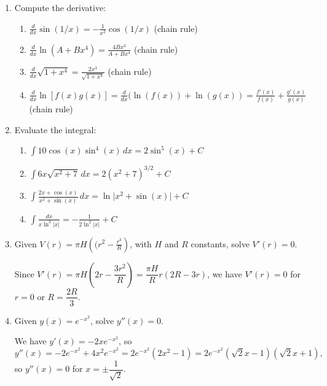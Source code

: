\documentclass[12pt]{article}
\newcommand{\di}{\displaystyle}
\newcommand{\abs}[1]{\lvert #1\rvert}
\begin{document}
  \begin{enumerate}
    \item Compute the derivative:
  
    \begin{enumerate}
    \item $\di\frac{d}{dx}\sin(1/x) = -\frac{1}{x^2}\cos(1/x)$ (chain rule)
    
 
    
    \item $\di\frac{d}{dx}\ln(A+Bx^4) = \frac{4Bx^3}{A+Bx^4}$ (chain rule) 
    
    
    \item $\di\frac{d}{dx}\sqrt{1+x^4} = \frac{2x^3}{\sqrt{1+x^4}}$ (chain rule)
    
    \item $\di\frac{d}{dx}\ln[f(x)g(x)] = \frac{d}{dx}(\ln(f(x))+\ln(g(x))=\frac{f'(x)}{f(x)}+\frac{g'(x)}{g(x)}$ (chain rule)
    
   
    \end{enumerate} 
    \item Evaluate the integral:
    \begin{enumerate}
    \item $\di\int 10\cos(x)\sin^4(x)\,dx = 2\sin^5(x)+C$
    
    
    \item $\di\int 6x\sqrt{x^2+7}\,dx = 2(x^2+7)^{3/2}+C$
    
    
    \item $\di\int\frac{2x+\cos(x)}{x^2+\sin(x)}\,dx = \ln\abs{x^2+\sin(x)}+C$
    
    
    \item $\di\int\frac{dx}{x\ln^3\abs{x}}= -\frac{1}{2\ln^2\abs{x}}+C$
    \end{enumerate}
    
    
    \item Given $V(r)=\pi H\left((r^2-\frac{r^3}{R}\right)$, with $H$ and $R$ constants, solve $V'(r)=0$.

   Since $V'(r) = \pi H\left(2r-\dfrac{3r^2}{R}\right) = \dfrac{\pi H}{R} r(2R-3r)$, we have $V'(r)=0$ for $r=0$ or $R=\dfrac{2R}{3}$.
   
   
   \item Given $y(x)=e^{-x^2}$, solve $y''(x)=0$.
   
   We have $y'(x) = -2xe^{-x^2}$, so 
   \[
   y''(x) = -2e^{-x^2}+4x^2e^{-x^2}=2e^{-x^2}(2x^2-1)=2e^{-x^2}(\sqrt{2}x-1)(\sqrt{2}x+1),
   \]
   so $y''(x)=0$ for $x = \pm\dfrac{1}{\sqrt{2}}$.
   

\end{enumerate}
\end{document}
